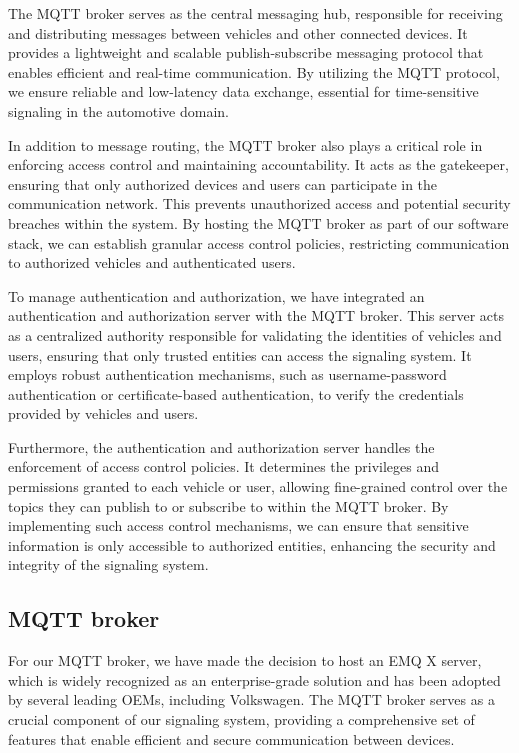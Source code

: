 \documentclass[
12pt,
oneside, 
onehalfspacing, 
nolistspacing, 
parskip, 
chapterinoneline, 
]{AASTCOMPUTER}
\begin{document}
The MQTT broker serves as the central messaging hub, responsible for receiving and distributing messages between vehicles and other connected devices. It provides a lightweight and scalable publish-subscribe messaging protocol that enables efficient and real-time communication. By utilizing the MQTT protocol, we ensure reliable and low-latency data exchange, essential for time-sensitive signaling in the automotive domain.

In addition to message routing, the MQTT broker also plays a critical role in enforcing access control and maintaining accountability. It acts as the gatekeeper, ensuring that only authorized devices and users can participate in the communication network. This prevents unauthorized access and potential security breaches within the system. By hosting the MQTT broker as part of our software stack, we can establish granular access control policies, restricting communication to authorized vehicles and authenticated users.

To manage authentication and authorization, we have integrated an authentication and authorization server with the MQTT broker. This server acts as a centralized authority responsible for validating the identities of vehicles and users, ensuring that only trusted entities can access the signaling system. It employs robust authentication mechanisms, such as username-password authentication or certificate-based authentication, to verify the credentials provided by vehicles and users.

Furthermore, the authentication and authorization server handles the enforcement of access control policies. It determines the privileges and permissions granted to each vehicle or user, allowing fine-grained control over the topics they can publish to or subscribe to within the MQTT broker. By implementing such access control mechanisms, we can ensure that sensitive information is only accessible to authorized entities, enhancing the security and integrity of the signaling system.

\subsection{MQTT broker}
For our MQTT broker, we have made the decision to host an EMQ X server, which is widely recognized as an enterprise-grade solution and has been adopted by several leading OEMs, including Volkswagen. The MQTT broker serves as a crucial component of our signaling system, providing a comprehensive set of features that enable efficient and secure communication between devices.
\end{document}
